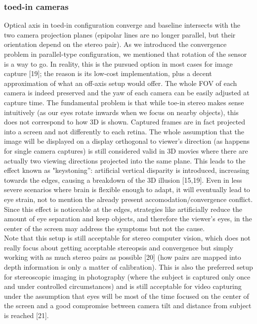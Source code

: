 \subsubsection{toed-in cameras}
Optical axis in toed-in configuration converge and baseline intersects with the two camera projection planes (epipolar lines are no longer parallel, but their orientation depend on the stereo pair). As we introduced the convergence problem in parallel-type configuration, we mentioned that rotation of the sensor is a way to go. In reality, this is the pursued option in most cases for image capture [19]; the reason is its low-cost implementation, plus a decent approximation of what an off-axis setup would offer. The whole FOV of each camera is indeed preserved and the yaw of each camera can be easily adjusted at capture time. The fundamental problem is that while toe-in stereo makes sense intuitively (as our eyes rotate inwards when we focus on nearby objects), this does not correspond to how 3D is shown. Captured frames are in fact projected into a screen and not differently to each retina. The whole assumption that the image will be displayed on a display orthogonal to viewer’s direction (as happens for single camera captures) is still considered valid in 3D movies where there are actually two viewing directions projected into the same plane. This leads to the effect known as "keystoning”: artificial vertical disparity is introduced, increasing towards the edges, causing a breakdown of the 3D illusion [15,19]. Even in less severe scenarios where brain is flexible enough to adapt, it will eventually lead to eye strain, not to mention the already present accomodation/convergence conflict. Since this effect is noticeable at the edges, strategies like artificially reduce the amount of eye separation and keep objects, and therefore the viewer’s eyes, in the center of the screen may address the symptoms but not the cause.\\
Note that this setup is still acceptable for stereo computer vision, which does not really focus about getting acceptable stereopsis and convergence but simply working with as much stereo pairs as possible [20] (how pairs are mapped into depth information is only a matter of calibration). This is also the preferred setup for stereoscopic imaging in photography (where the subject is captured only once and under controlled circumstances) and is still acceptable for video capturing under the assumption that eyes will be most of the time focused on the center of the screen and a good compromise between camera tilt and distance from subject is reached [21].

